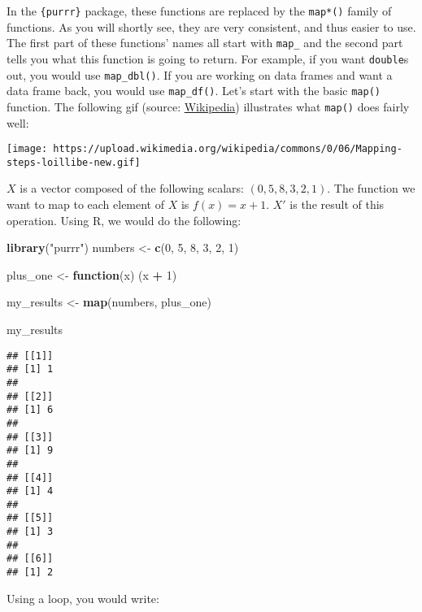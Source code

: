 \documentclass[
]{article}
\newenvironment{Shaded}{\begin{snugshade}}{\end{snugshade}}
\newcommand{\ControlFlowTok}[1]{\textcolor[rgb]{0.13,0.29,0.53}{\textbf{#1}}}
\newcommand{\DecValTok}[1]{\textcolor[rgb]{0.00,0.00,0.81}{#1}}
\newcommand{\KeywordTok}[1]{\textcolor[rgb]{0.13,0.29,0.53}{\textbf{#1}}}
\newcommand{\NormalTok}[1]{#1}
\newcommand{\OperatorTok}[1]{\textcolor[rgb]{0.81,0.36,0.00}{\textbf{#1}}}
\newcommand{\StringTok}[1]{\textcolor[rgb]{0.31,0.60,0.02}{#1}}
\begin{document}
In the \texttt{\{purrr\}} package, these functions are replaced by the \texttt{map*()} family of functions. As you will
shortly see, they are very consistent, and thus easier to use.
The first part of these functions' names all start with \texttt{map\_} and the second part tells you what
this function is going to return. For example, if you want \texttt{double}s out, you would use \texttt{map\_dbl()}.
If you are working on data frames and want a data frame back, you would use \texttt{map\_df()}. Let's start
with the basic \texttt{map()} function. The following gif
(source: \href{https://en.wikipedia.org/wiki/Map_(higher-order_function)}{Wikipedia}) illustrates
what \texttt{map()} does fairly well:

\texttt{[image: https://upload.wikimedia.org/wikipedia/commons/0/06/Mapping-steps-loillibe-new.gif]}

\(X\) is a vector composed of the following scalars: \((0, 5, 8, 3, 2, 1)\). The function we want to
map to each element of \(X\) is \(f(x) = x + 1\). \(X'\) is the result of this operation. Using R, we
would do the following:

\begin{Shaded}
\begin{Highlighting}[]
\KeywordTok{library}\NormalTok{(}\StringTok{"purrr"}\NormalTok{)}
\NormalTok{numbers \textless{}{-}}\StringTok{ }\KeywordTok{c}\NormalTok{(}\DecValTok{0}\NormalTok{, }\DecValTok{5}\NormalTok{, }\DecValTok{8}\NormalTok{, }\DecValTok{3}\NormalTok{, }\DecValTok{2}\NormalTok{, }\DecValTok{1}\NormalTok{)}

\NormalTok{plus\_one \textless{}{-}}\StringTok{ }\ControlFlowTok{function}\NormalTok{(x) (x }\OperatorTok{+}\StringTok{ }\DecValTok{1}\NormalTok{)}

\NormalTok{my\_results \textless{}{-}}\StringTok{ }\KeywordTok{map}\NormalTok{(numbers, plus\_one)}

\NormalTok{my\_results}
\end{Highlighting}
\end{Shaded}

\begin{verbatim}
## [[1]]
## [1] 1
## 
## [[2]]
## [1] 6
## 
## [[3]]
## [1] 9
## 
## [[4]]
## [1] 4
## 
## [[5]]
## [1] 3
## 
## [[6]]
## [1] 2
\end{verbatim}

Using a loop, you would write:
\end{document}
